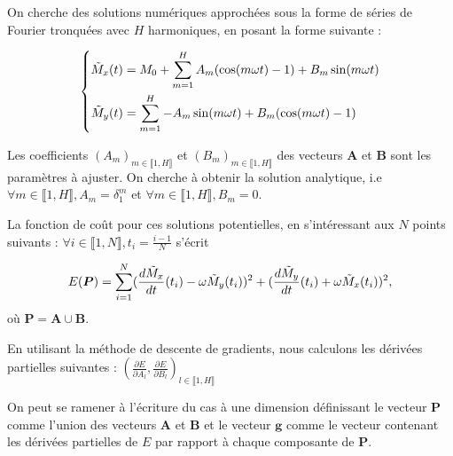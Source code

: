 \documentclass[12pt]{report}
\begin{document}
On cherche des solutions numériques approchées sous la forme de séries de Fourier tronquées avec $H$ harmoniques, en posant la forme suivante :

\begin{equation}
    \left\{
    \begin{aligned}
        \Tilde{M}_x(t) & = M_0 + \sum_{m=1}^{H} A_m (\cos(m\omega t)-1) + B_m \sin(m\omega t) \\
        \Tilde{M}_y(t) & = \sum_{m=1}^{H} -A_m \sin(m\omega t) + B_m (\cos(m\omega t)-1)
    \end{aligned}
    \right.
    \label{eq:solution_fourier_couplee_2D}
\end{equation}

Les coefficients $(A_m)_{m\in \llbracket 1,H \rrbracket}$ et $(B_m)_{m\in \llbracket 1,H \rrbracket}$ des vecteurs ${\bm A}$ et ${\bm B}$ sont les paramètres à ajuster.
On cherche à obtenir la solution analytique, i.e $\forall m \in\llbracket 1,H \rrbracket, A_m = \delta _1 ^m $ et $\forall m \in\llbracket 1,H \rrbracket, B_m = 0 $.

La fonction de coût pour ces solutions potentielles, en s'intéressant aux $N$ points suivants : $\forall i \in\llbracket 1,N \rrbracket, t_i = \frac{i-1}{N} $ s'écrit

\begin{equation}
    E(\bm{P}) = \sum_{i=1}^{N} (\frac{d\Tilde{M}_x}{dt}(t_i) - \omega \Tilde{M}_y(t_i))^2 + (\frac{d\Tilde{M}_y}{dt}(t_i) + \omega \Tilde{M}_x(t_i))^2,
    \label{eq:erreur_descente_gradient_couplees}
\end{equation}
où ${\bm P}={\bm A}\cup\bm B$.

En utilisant la méthode de descente de gradients, nous calculons les dérivées partielles suivantes :
$(\frac{\partial E}{\partial A_l}, \frac{\partial E}{\partial B_l})_{l \in \llbracket 1,H \rrbracket}$

On peut se ramener à l'écriture du cas à une dimension définissant le vecteur $\bm{P}$ comme l'union des vecteurs $\bm{A}$ et $\bm{B}$ et le vecteur $\bm{g}$ comme le vecteur contenant les dérivées partielles de $E$ par rapport à chaque composante de $\bm{P}$.
\end{document}
